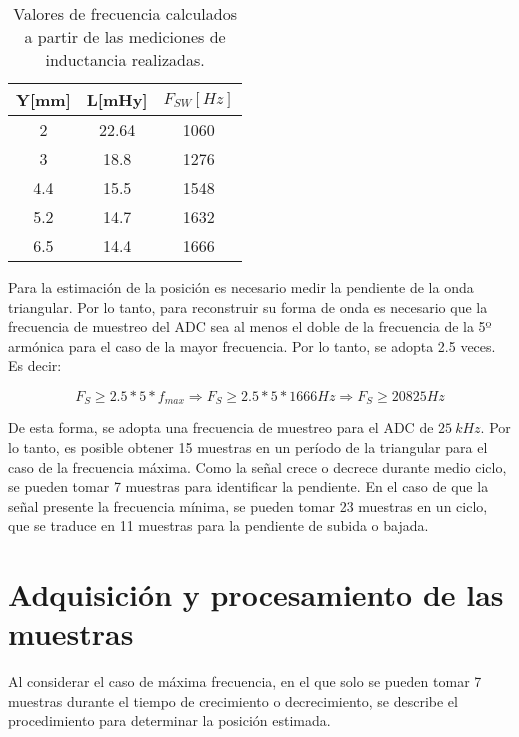 \begin{table}[H]
	\begin{center}
		\begin{tabular}{| c | c | c |}
			\hline
			Y[mm] & L[mHy] & $F_{SW}[Hz]$\\ \hline
			2 & 22.64 & 1060\\ \hline
			3 & 18.8 & 1276\\ \hline
			4.4 & 15.5 & 1548\\ \hline
			5.2 & 14.7 & 1632\\ \hline		
			6.5 & 14.4 & 1666\\ \hline
		\end{tabular}
		\caption{Valores de frecuencia calculados a partir de las mediciones de inductancia realizadas.}
		\label{frecuencias-calculadas}
	\end{center}
\end{table}


\noindent Para la estimación de la posición es necesario medir la pendiente de la onda triangular. Por lo tanto, para reconstruir su forma de onda es necesario que la frecuencia de muestreo del ADC sea al menos el doble de la frecuencia de la 5º armónica para el caso de la mayor frecuencia. Por lo tanto, se adopta 2.5 veces. Es decir:

\begin{equation} 
	F_S \geq 2.5 * 5 * f_{max} \Rightarrow  F_S \geq 2.5 * 5 * 1666 Hz \Rightarrow F_S \geq 20825 Hz
\end{equation}

\noindent De esta forma, se adopta una frecuencia de muestreo para el ADC de  $25 \:kHz$. Por lo tanto, es posible obtener 15 muestras en un período de la triangular para el caso de la frecuencia máxima. Como la señal crece o decrece durante medio ciclo, se pueden tomar 7 muestras para identificar la pendiente. En el caso de que la señal presente la frecuencia mínima, se pueden tomar 23 muestras en un ciclo, que se traduce en 11 muestras para la pendiente de subida o bajada. 


\section{Adquisición y procesamiento de las muestras}

\noindent Al considerar el caso de máxima frecuencia, en el que solo se pueden tomar 7 muestras durante el tiempo de crecimiento o decrecimiento, se describe el procedimiento para determinar la posición estimada.


